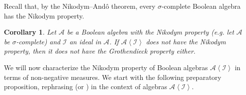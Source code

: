 \documentclass[a4paper,11pt,fleqn]{amsart}
\newtheorem{corollary}[theorem]{Corollary}
\theoremstyle{definition}
\theoremstyle{remark}
\numberwithin{equation}{section}
\newcommand{\aA}{\mathcal{A}}
\newcommand{\iI}{\mathcal{I}}
\newcommand{\gen}[1]{\mathopen{}\left\langle#1\mathclose{}\right\rangle}
\begin{document}
Recall that, by the Nikodym--And\^{o} theorem, every $\sigma$-complete Boolean algebra has the Nikodym property.

\begin{corollary}\label{cor:sigmacompl_ideal}
    Let $\aA$ be a Boolean algebra with the Nikodym property (e.g. let $\aA$ be $\sigma$-complete) and $\iI$ an ideal in $\aA$. If $\aA\gen{\iI}$ does not have the Nikodym property, then it does not have the Grothendieck property either.
\end{corollary}

We will now characterize the Nikodym property of Boolean algebras $\aA\gen{\iI}$ in terms of non-negative measures. We start with the following preparatory proposition, rephrasing \cite[Proposition 2.4]{SZ19} (or \cite[Lemma 4.1]{SZ24}) in the context of algebras $\aA\gen{\iI}$.
\end{document}
